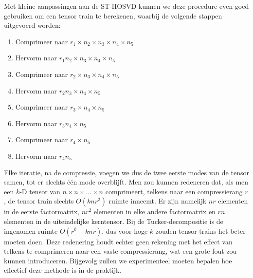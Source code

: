 Met kleine aanpassingen aan de ST-HOSVD kunnen we deze procedure even goed gebruiken om een tensor train te berekenen, waarbij de volgende stappen uitgevoerd worden:

\begin{enumerate}
\item Comprimeer naar $r_1 \times n_2 \times n_3 \times n_4 \times n_5$
\item Hervorm naar $r_1 n_2 \times n_3 \times n_4 \times n_5$
\item Comprimeer naar $r_2 \times n_3 \times n_4 \times n_5$
\item Hervorm naar $r_2 n_3 \times n_4 \times n_5$
\item Comprimeer naar $r_3 \times n_4 \times n_5$
\item Hervorm naar $r_3 n_4 \times n_5$
\item Comprimeer naar $r_4 \times n_5$
\item Hervorm naar $r_4 n_5$
\end{enumerate}

Elke iteratie, na de compressie, voegen we dus de twee eerste modes van de tensor samen, tot er slechts \'e\'en mode overblijft. Men zou kunnen redeneren dat, als men een $k$-D tensor van $n \times n \times \dots \times n$ comprimeert, telkens naar een compressierang $r$, de tensor train slechts $O(knr^2)$ ruimte inneemt. Er zijn namelijk $nr$ elementen in de eerste factormatrix, $nr^2$ elementen in elke andere factormatrix en $rn$ elementen in de uiteindelijke kerntensor. Bij de Tucker-decompositie is de ingenomen ruimte $O(r^k + knr)$, dus voor hoge $k$ zouden tensor trains het beter moeten doen. Deze redenering houdt echter geen rekening met het effect van telkens te comprimeren naar een vaste compressierang, wat een grote fout zou kunnen introduceren. Bijgevolg zullen we experimenteel moeten bepalen hoe effectief deze methode is in de praktijk.

